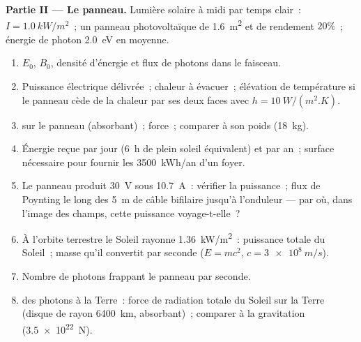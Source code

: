 \begin{problem}
\medskip
\noindent\textbf{Partie II --- Le panneau.}
Lumière solaire à midi par temps clair~: $I = \qty{1.0}{kW/m^2}$~; un panneau
photovoltaïque de \qty{1.6}{m^2} et de rendement $20\%$~; énergie de photon \qty{2.0}{eV}
en moyenne.
\begin{enumerate}[resume]
  \item $E_0$, $B_0$, densité d'énergie et flux de photons dans le faisceau.
  \item Puissance électrique délivrée~; chaleur à évacuer~; élévation de
        température si le panneau cède de la chaleur par ses deux faces avec $h = \qty{10}{W/(m^2.K)}$.
  \item {} sur le panneau (absorbant)~; force~; comparer
        à son poids (\qty{18}{kg}).
  \item Énergie reçue par jour (\qty{6}{h} de plein soleil équivalent) et
        par an~; surface nécessaire pour fournir les
        \qty{3500}{kWh/an} d'un foyer.
  \item Le panneau produit \qty{30}{V} sous \qty{10.7}{A}~: vérifier la puissance~;
        flux de Poynting le long des \qty{5}{m} de câble bifilaire jusqu'à
        l'onduleur --- par où, dans l'image des champs, cette puissance
        voyage-t-elle~?
  \item À l'orbite terrestre le Soleil rayonne \qty{1.36}{kW/m^2}~: puissance
        totale du Soleil~; masse qu'il convertit par seconde ($E = mc^2$,
        $c = \qty{3e8}{m/s}$).
  \item Nombre de photons frappant le panneau par seconde.
  \item {} des photons à la Terre~: force de radiation totale du
        Soleil sur la Terre (disque de rayon \qty{6400}{km}, absorbant)~;
        comparer à la gravitation (\qty{3.5e22}{N}).
\end{enumerate}


\end{problem}

